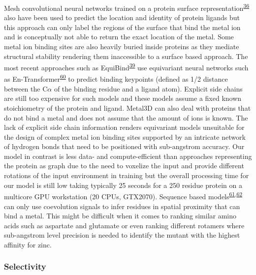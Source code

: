 \documentclass[ lineno,
  9pt]{elife}
\begin{document}
Mesh convolutional neural networks trained on a protein surface representation\textsuperscript{\protect\hyperlink{ref-yBhqGkBa}{36}} also have been used to predict the location and identity of protein ligands but this approach can only label the regions of the surface that bind the metal ion and is conceptually not able to return the exact location of the metal. Some metal ion binding sites are also heavily buried inside proteins as they mediate structural stability rendering them inaccessible to a surface based approach. The most recent approaches such as EquiBind\textsuperscript{\protect\hyperlink{ref-13hjzBbje}{39}} use equivariant neural networks such as En-Transformer\textsuperscript{\protect\hyperlink{ref-Fc42fl1x}{60}} to predict binding keypoints (defined as 1/2 distance between the C$\alpha$ of the binding residue and a ligand atom). Explicit side chains are still too expensive for such models and these models assume a fixed known stoichiometry of the protein and ligand. Metal3D can also deal with proteins that do not bind a metal and does not assume that the amount of ions is known. The lack of explicit side chain information renders equivariant models unsuitable for the design of complex metal ion binding sites supported by an intricate network of hydrogen bonds that need to be positioned with sub-angstrom accuracy. Our model in contrast is less data- and compute-efficient than approaches representing the protein as graph due to the need to voxelize the input and provide different rotations of the input environment in training but the overall processing time for our model is still low taking typically 25 seconds for a 250 residue protein on a multicore GPU workstation (20 CPUs, GTX2070).
Sequence based models\textsuperscript{\protect\hyperlink{ref-cbwvbkS6}{61},\protect\hyperlink{ref-Gj0pG9O5}{62}} can only use coevolution signals to infer residues in spatial proximity that can bind a metal. This might be difficult when it comes to ranking similar amino acids such as aspartate and glutamate or even ranking different rotamers where sub-angstrom level precision is needed to identify the mutant with the highest affinity for zinc.

\hypertarget{selectivity}{%
\subsubsection{Selectivity}\label{selectivity}}
\end{document}

